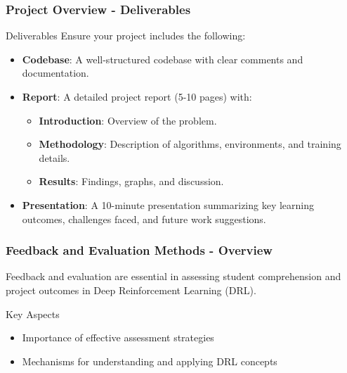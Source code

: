 \documentclass[aspectratio=169]{beamer}
\begin{document}
\begin{frame}[fragile]
    \frametitle{Project Overview - Deliverables}
    \begin{block}{Deliverables}
        Ensure your project includes the following:
    \end{block}
    \begin{itemize}
        \item \textbf{Codebase}: A well-structured codebase with clear comments and documentation.
        \item \textbf{Report}: A detailed project report (5-10 pages) with:
        \begin{itemize}
            \item \textbf{Introduction}: Overview of the problem.
            \item \textbf{Methodology}: Description of algorithms, environments, and training details.
            \item \textbf{Results}: Findings, graphs, and discussion.
        \end{itemize}
        \item \textbf{Presentation}: A 10-minute presentation summarizing key learning outcomes, challenges faced, and future work suggestions.
    \end{itemize}
\end{frame}

\begin{frame}[fragile]
  \frametitle{Feedback and Evaluation Methods - Overview}
  Feedback and evaluation are essential in assessing student comprehension and project outcomes in Deep Reinforcement Learning (DRL). 

  \begin{block}{Key Aspects}
    \begin{itemize}
      \item Importance of effective assessment strategies
      \item Mechanisms for understanding and applying DRL concepts
    \end{itemize}
  \end{block}
\end{frame}
\end{document}
